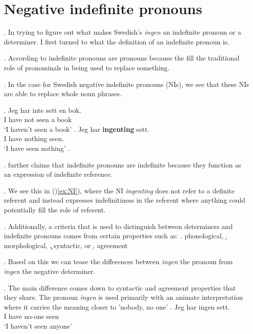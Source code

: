 \documentclass[12pt, letterpaper]{article}
\begin{document}
\section*{Negative indefinite pronouns}

\ex. In trying to figure out what makes Swedish's \textit{ingen} an indefinite pronoun or a determiner. I first turned to what the definition of an indefinite pronoun is. 

\ex. According to \cite{haspelmathIndefinitePronouns1997} indefinite pronouns are pronouns because the fill the traditional role of pronominals in being used to replace something.

\ex. In the case for Swedish negative indefinite pronouns (NIs), we see that these NIs are able to replace whole noun phrases.
\begin{multicols}{2}
	\ag. Jeg har inte sett en bok.\\
I have not seen a book\\
`I haven't seen a book'
\bg. \label{ex:NI} Jeg har \textbf{ingenting} sett.\\
I have nothing seen.\\
`I have seen nothing'
\z.
\end{multicols}

\ex. \citeauthor{haspelmathIndefinitePronouns1997} further claims that indefinite pronouns are indefinite because they function as an expression of indefinite reference.

\ex. We see this in ()\ref{ex:NI}), where the NI \textit{ingenting} does not refer to a definite referent and instead expresses indefinitiness in the referent where anything could potentially fill the role of referent.

\ex. Additionally, a criteria that is used to distinguish between determiners and indefinite pronouns comes from certain properties such as:
\a. phonological, 
\b. morphological,
\c. syntactic, or
\d. agreement

\ex. Based on this we can tease the differences between \textit{ingen} the pronoun from \textit{ingen} the negative determiner.

\ex. The main difference comes down to syntactic and agreement properties that they share. The pronoun \textit{ingen} is used primarily with an animate interpretation where it carries the meaning closer to 'nobody, no one' 
\ag. Jeg har ingen sett.\\
I have no-one seen\\
`I haven't seen anyone'
\end{document}
